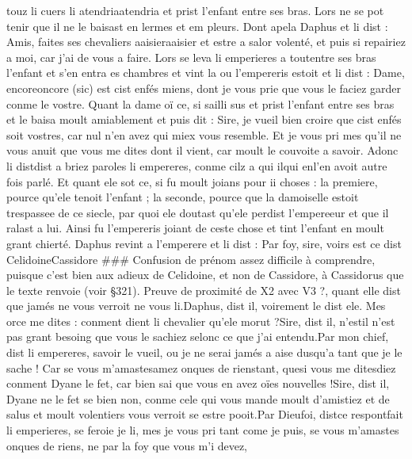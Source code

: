 \documentclass{article}
\begin{document}
\begin{pages}
   touz li cuers li atendriaatendria
   et prist l’enfant entre ses bras. Lors 
   ne se pot tenir que il ne le baisast en lermes et em pleurs. 
   Dont apela Daphus et li dist : 
   Amis, faites ses chevaliers 
      aaisieraaisier et estre a 
         salor volenté, et puis si repairiez a moi, 
      car j’ai de vous a faire.
   Lors se leva li emperieres 
   a toutentre ses bras l’enfant 
   et s’en entra es chambres et vint la ou l’empereris
   estoit et li dist :
   Dame, encoreoncore (sic) est 
      cist enfés miens,
      dont je vous prie que vous le faciez garder conme le vostre.
   Quant la dame oï ce, si sailli sus et prist l’enfant entre ses bras 
   et le baisa moult amiablement et puis dit :
   Sire, je vueil bien croire que cist enfés soit vostres, car nul n’en 
      avez qui miex vous resemble. Et je vous pri mes qu’il ne vous anuit que vous me dites dont il vient, car moult le couvoite a savoir.
   Adonc li distdist a briez paroles 
   li empereres, conme cilz a qui ilqui 
   enl'en avoit autre fois parlé.
   Et quant ele sot ce, si fu moult joians pour ii choses : la premiere, pource qu’ele tenoit 
   l’enfant ; la seconde, pource que la damoiselle 
   estoit trespassee de ce siecle, par quoi ele doutast qu’ele perdist l’empereeur et 
   que il ralast a lui. \pend
\pstart Ainsi fu l’empereris joiant de ceste chose et 
   tint l’enfant en moult grant chierté. Daphus revint a 
   l’emperere et li dist :
   Par foy, sire, voirs est 
      ce dist 
      CelidoineCassidore
      ### Confusion de prénom assez difficile à comprendre, puisque c'est bien
         aux adieux de Celidoine, et non de Cassidore, à Cassidorus que le texte renvoie (voir §321). 
         Preuve de proximité de X2 avec V3 ?, 
   quant elle dist que jamés ne vous verroit ne vous li.Daphus, dist il, voirement le dist ele. Mes 
      orce me dites : conment dient li chevalier qu’ele morut ?Sire, dist il, n’estil n'est 
      pas grant besoing que vous le sachiez selonc ce que j’ai entendu.Par mon chief, dist li empereres, savoir le vueil, 
      ou je ne serai jamés a aise dusqu’a tant que je le sache ! Car se vous 
      m’amastesamez 
      onques de rienstant, 
      quesi vous me 
      ditesdiez conment Dyane le fet, 
   car bien sai que vous en avez oïes nouvelles !Sire, dist il, Dyane ne 
      le fet se bien non, conme cele qui vous mande moult d’amistiez et 
      de salus et moult volentiers vous verroit se estre pooit.Par Dieufoi, 
      distce respontfait 
      li emperieres, se feroie je li, mes 
      je vous pri tant come je puis, se vous m’amastes onques de riens, ne par la foy que vous m’i devez, 

\end{pages}
\end{document}
